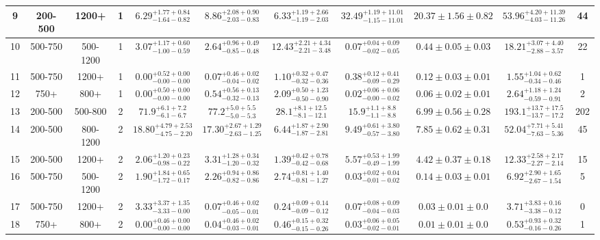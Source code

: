 \begin{table}
{\begin{tabular}{ |c|c|c|c||c|c|c|c|c||c|c| }
9 & 200-500 & 1200+ & 1 & $6.29^{+1.77+0.84}_{-1.64-0.82}$ & $8.86^{+2.08+0.90}_{-2.03-0.83}$ & $6.33^{+1.19+2.66}_{-1.19-2.03}$ & $32.49^{+1.19+11.01}_{-1.15-11.01}$ &$20.37\pm 1.56 \pm0.82$& $53.96^{+4.20+11.39}_{-4.03-11.26}$ & 44 \\ \hline
10 & 500-750 & 500-1200 & 1 & $3.07^{+1.17+0.60}_{-1.00-0.59}$ & $2.64^{+0.96+0.49}_{-0.85-0.48}$ & $12.43^{+2.21+4.34}_{-2.21-3.48}$ & $0.07^{+0.04+0.09}_{-0.02-0.05}$ &$0.44\pm 0.05 \pm0.03$& $18.21^{+3.07+4.40}_{-2.88-3.57}$ & 22 \\ \hline
11 & 500-750 & 1200+ & 1 & $0.00^{+0.52+0.00}_{-0.00-0.00}$ & $0.07^{+0.46+0.02}_{-0.04-0.02}$ & $1.10^{+0.32+0.47}_{-0.32-0.36}$ & $0.38^{+0.12+0.41}_{-0.09-0.29}$&$0.12\pm 0.03 \pm0.01$& $1.55^{+1.04+0.62}_{-0.34-0.46}$ & 1 \\ \hline
12 & 750+ & 800+ & 1 & $0.00^{+0.50+0.00}_{-0.00-0.00}$ & $0.54^{+0.56+0.13}_{-0.32-0.13}$ & $2.09^{+0.50+1.23}_{-0.50-0.90}$ & $0.02^{+0.06+0.06}_{-0.00-0.02}$&$0.06\pm 0.02 \pm0.01$& $2.64^{+1.18+1.24}_{-0.59-0.91}$ & 2 \\ \hline
13 & 200-500 & 500-800 & 2 & $71.9^{+6.1+7.2}_{-6.1-6.7}$ & $77.2^{+5.0+5.5}_{-5.0-5.3}$ & $28.1^{+8.1+12.5}_{-8.1-12.1}$ & $15.9^{+1.1+8.8}_{-1.1-8.8}$ &$6.99\pm 0.56 \pm0.28$& $193.1^{+13.7+17.5}_{-13.7-17.2}$ & 202 \\ \hline
14 & 200-500 & 800-1200 & 2 & $18.80^{+4.79+2.53}_{-4.75-2.20}$ & $17.30^{+2.67+1.29}_{-2.63-1.25}$ & $6.44^{+1.87+2.90}_{-1.87-2.81}$ & $9.49^{+0.61+3.80}_{-0.57-3.80}$ &$7.85\pm 0.62 \pm0.31$& $52.04^{+7.71+5.41}_{-7.63-5.36}$ & 45 \\ \hline
15 & 200-500 & 1200+ & 2 & $2.06^{+1.20+0.23}_{-0.98-0.22}$ & $3.31^{+1.28+0.34}_{-1.20-0.32}$ & $1.39^{+0.42+0.78}_{-0.42-0.68}$ & $5.57^{+0.53+1.99}_{-0.49-1.99}$ &$4.42\pm 0.37 \pm0.18$& $12.33^{+2.58+2.17}_{-2.27-2.14}$ & 15 \\ \hline
16 & 500-750 & 500-1200 & 2 & $1.90^{+1.84+0.65}_{-1.72-0.17}$ & $2.26^{+0.94+0.86}_{-0.82-0.86}$ & $2.74^{+0.81+1.40}_{-0.81-1.27}$ & $0.03^{+0.02+0.04}_{-0.01-0.02}$ &$0.14\pm 0.03 \pm0.01$& $6.92^{+2.90+1.65}_{-2.67-1.54}$ & 5 \\ \hline
17 & 500-750 & 1200+ & 2 & $3.33^{+3.37+1.35}_{-3.33-0.00}$ & $0.07^{+0.46+0.02}_{-0.05-0.01}$ & $0.24^{+0.09+0.14}_{-0.09-0.12}$ & $0.07^{+0.08+0.09}_{-0.04-0.03}$&$0.03\pm 0.01 \pm0.0$& $3.71^{+3.83+0.16}_{-3.38-0.12}$ & 0 \\ \hline
18 & 750+ & 800+ & 2 & $0.00^{+0.46+0.00}_{-0.00-0.00}$ & $0.04^{+0.46+0.02}_{-0.03-0.01}$ & $0.46^{+0.15+0.32}_{-0.15-0.26}$ & $0.03^{+0.06+0.05}_{-0.02-0.01}$ &$0.01\pm 0.01 \pm0.0$& $0.53^{+0.93+0.32}_{-0.16-0.26}$ & 1 \\ \hline

\end{tabular}}
\end{table}
